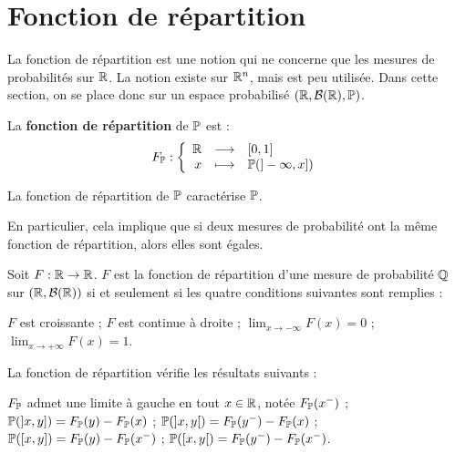 \documentclass[../integ-proba.tex]{subfiles}
\begin{document}
    \section{Fonction de répartition}

    La fonction de répartition est une notion qui ne concerne que les mesures de probabilités sur $\mathbb{R}$.
    La notion existe sur $\mathbb{R}^n$, mais est peu utilisée.
    Dans cette section, on se place donc sur un espace probabilisé $\left( \mathbb{R}, \mathcal{B}(\mathbb{R}), \mathbb{P} \right)$.

    \begin{defi}
        La \textbf{fonction de répartition} de $\mathbb{P}$ est :
        \begin{displaymath}
            F_{\mathbb{P}}:
            \left\{
            \begin{array}{rcl}
                \mathbb{R} & \longrightarrow & [0,1] \\
                x          & \longmapsto     & \mathbb{P}(]- \infty, x])
            \end{array}
            \right.
        \end{displaymath}
    \end{defi}

    \begin{thm}
        La fonction de répartition de $\mathbb{P}$ caractérise $\mathbb{P}$.
    \end{thm}

    \begin{rem}
        En particulier, cela implique que si deux mesures de probabilité ont la même fonction de répartition, alors elles sont égales.
    \end{rem}

    \begin{thm}
        \label{thm:carac_fdrep}
        Soit $F:\mathbb{R} \rightarrow \mathbb{R}$.
        $F$ est la fonction de répartition d'une mesure de probabilité $\mathbb{Q}$ sur $\left( \mathbb{R}, \mathcal{B}(\mathbb{R}) \right)$ si et seulement si les quatre conditions suivantes sont remplies :
        \begin{itemize}
            \itemb $F$ est croissante ;
            \itemb $F$ est continue à droite ;
            \itemb $\lim_{x \to -\infty} F(x) = 0$ ;
            \itemb $\lim_{x \to +\infty} F(x) = 1$.
        \end{itemize}
    \end{thm}

    \begin{prop}
        La fonction de répartition vérifie les résultats suivants :
        \begin{itemize}
            \itemb $F_{\mathbb{P}}$ admet une limite à gauche en tout $x \in \mathbb{R}$, notée $F_{\mathbb{P}}(x^-)$ ;
            \itemb $\mathbb{P}(]x,y]) = F_{\mathbb{P}}(y) - F_{\mathbb{P}}(x)$ ;
            \itemb $\mathbb{P}(]x,y[) = F_{\mathbb{P}}(y^-) - F_{\mathbb{P}}(x)$ ;
            \itemb $\mathbb{P}([x,y]) = F_{\mathbb{P}}(y) - F_{\mathbb{P}}(x^-)$ ;
            \itemb $\mathbb{P}([x,y[) = F_{\mathbb{P}}(y^-) - F_{\mathbb{P}}(x^-)$.
        \end{itemize}
    \end{prop}
\end{document}

